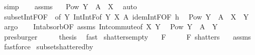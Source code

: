 \begin{isabellebody}
\ simp\isanewline
\ \ \isamarkupfalse%
\ assms\ \isamarkupfalse%
\ {}{\isacharcolon}{\kern0pt}\ {\isachardoublequoteopen}Pow\ Y\ {\isasymsubseteq}\ A\ {\isasyminter}{\isacharasterisk}{\kern0pt}\ X{\isachardoublequoteclose}\ \isamarkupfalse%
\ auto\isanewline
\ \ \isamarkupfalse%
\ subset{\isacharunderscore}{\kern0pt}IntF{\isacharbrackleft}{\kern0pt}OF\ {}{\isacharcomma}{\kern0pt}\ of\ Y{\isacharbrackright}{\kern0pt}\ Int{\isacharunderscore}{\kern0pt}IntF{\isacharbrackleft}{\kern0pt}of\ Y\ X\ A{\isacharbrackright}{\kern0pt}\ idem{\isacharunderscore}{\kern0pt}IntF{\isacharbrackleft}{\kern0pt}OF\ h{\isacharbrackright}{\kern0pt}\ \isamarkupfalse%
\ {\isachardoublequoteopen}Pow\ Y\ {\isasymsubseteq}\ A\ {\isasyminter}{\isacharasterisk}{\kern0pt}\ {\isacharparenleft}{\kern0pt}X\ {\isasyminter}\ Y{\isacharparenright}{\kern0pt}{\isachardoublequoteclose}\ \isamarkupfalse%
\ argo\isanewline
\ \ \isamarkupfalse%
\ Int{\isacharunderscore}{\kern0pt}absorb{}{\isacharbrackleft}{\kern0pt}OF\ assms{\isacharparenleft}{\kern0pt}{}{\isacharparenright}{\kern0pt}{\isacharbrackright}{\kern0pt}\ Int{\isacharunderscore}{\kern0pt}commute{\isacharbrackleft}{\kern0pt}of\ X\ Y{\isacharbrackright}{\kern0pt}\ \isamarkupfalse%
\ {\isachardoublequoteopen}Pow\ Y\ {\isasymsubseteq}\ A\ {\isasyminter}{\isacharasterisk}{\kern0pt}\ Y{\isachardoublequoteclose}\ \isamarkupfalse%
\ presburger\isanewline
\ \ \isamarkupfalse%
\ \isamarkupfalse%
\ {\isacharquery}{\kern0pt}thesis\ \isamarkupfalse%
\ fast\isanewline
{}\isamarkupfalse%
%
\endisatagproof
{\isafoldproof}%
%
\isadelimproof
\isanewline
%
\endisadelimproof
\isanewline
{}\isamarkupfalse%
\ shatters{\isacharunderscore}{\kern0pt}empty{\isacharcolon}{\kern0pt}\isanewline
\ \ \ {\isachardoublequoteopen}F\ {\isasymnoteq}\ {\isacharbraceleft}{\kern0pt}{\isacharbraceright}{\kern0pt}{\isachardoublequoteclose}\isanewline
\ \ \ {\isachardoublequoteopen}F\ shatters\ {\isacharbraceleft}{\kern0pt}{\isacharbraceright}{\kern0pt}{\isachardoublequoteclose}\ \isanewline
%
\isadelimproof
%
\endisadelimproof
%
\isatagproof
{}\isamarkupfalse%
\ assms\ \isamarkupfalse%
\ fastforce%
\endisatagproof
{\isafoldproof}%
%
\isadelimproof
\isanewline
%
\endisadelimproof
\isanewline
{}\isamarkupfalse%
\ subset{\isacharunderscore}{\kern0pt}shattered{\isacharunderscore}{\kern0pt}by{\isacharcolon}{\kern0pt}\isanewline

\end{isabellebody}
